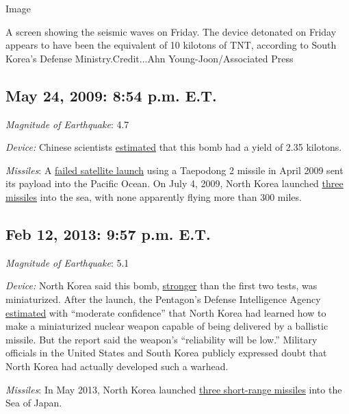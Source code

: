 Image

A screen showing the seismic waves on Friday. The device detonated on
Friday appears to have been the equivalent of 10 kilotons of TNT,
according to South Korea's Defense Ministry.Credit...Ahn
Young-Joon/Associated Press

\hypertarget{may-24-2009-854-pm-et}{%
\subsection{May 24, 2009: 8:54 p.m. E.T.}\label{may-24-2009-854-pm-et}}

\emph{Magnitude of Earthquake}: 4.7

\emph{Device:} Chinese scientists
\href{http://www.bssaonline.org/content/102/2/467.abstract?sid=7c769220-2dfc-45b2-96d7-73fef9aa8d48}{estimated}
that this bomb had a yield of 2.35 kilotons.

\emph{Missiles}: A
\href{http://www.nytimes3xbfgragh.onion/2009/04/06/world/asia/06korea.html}{failed
satellite launch} using a Taepodong 2 missile in April 2009 sent its
payload into the Pacific Ocean. On July 4, 2009, North Korea launched
\href{http://www.nytimes3xbfgragh.onion/2009/07/04/world/asia/04korea.html}{three
missiles} into the sea, with none apparently flying more than 300 miles.

\hypertarget{feb-12-2013-957-pm-et}{%
\subsection{Feb 12, 2013: 9:57 p.m. E.T.}\label{feb-12-2013-957-pm-et}}

\emph{Magnitude of Earthquake}: 5.1

\emph{Device:} North Korea said this bomb,
\href{http://www.ctbto.org/press-centre/press-releases/2013/ctbto-detects-radioactivity-consistent-with-12-february-announced-north-korean-nuclear-test/}{stronger}
than the first two tests, was miniaturized. After the launch, the
Pentagon's Defense Intelligence Agency
\href{http://www.nytimes3xbfgragh.onion/2013/04/12/world/asia/north-korea-may-have-nuclear-missile-capability-us-agency-says.html}{estimated}
with ``moderate confidence'' that North Korea had learned how to make a
miniaturized nuclear weapon capable of being delivered by a ballistic
missile. But the report said the weapon's ``reliability will be low.''
Military officials in the United States and South Korea publicly
expressed doubt that North Korea had actually developed such a warhead.

\emph{Missiles}: In May 2013, North Korea launched
\href{http://www.nytimes3xbfgragh.onion/2013/05/19/world/asia/north-korea-missiles.html}{three
short-range missiles} into the Sea of Japan.

